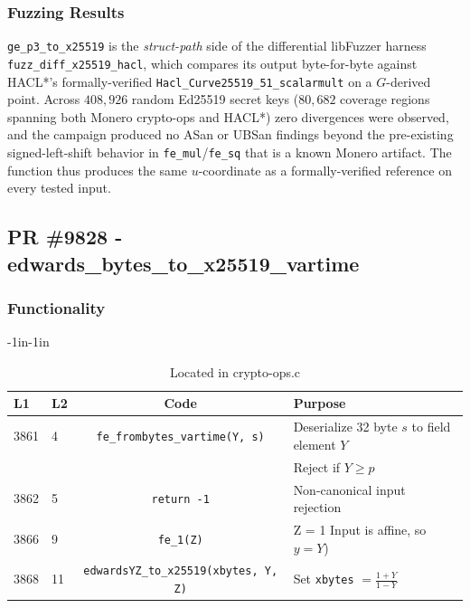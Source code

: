 \documentclass[12pt,titlepage,table]{article}
\begin{document}
\subsubsection{Fuzzing Results}
\verb+ge_p3_to_x25519+ is the \emph{struct-path} side of the differential libFuzzer harness \\ \verb+fuzz_diff_x25519_hacl+, which compares its output byte-for-byte against HACL*'s formally-verified \verb+Hacl_Curve25519_51_scalarmult+ on a $G$-derived point. Across $408{,}926$ random Ed25519 secret keys ($80{,}682$ coverage regions spanning both Monero crypto-ops and HACL*) zero divergences were observed, and the campaign produced no ASan or UBSan findings beyond the pre-existing signed-left-shift behavior in \verb+fe_mul+/\verb+fe_sq+ that is a known Monero artifact.  The function thus produces the same $u$-coordinate as a formally-verified reference on every tested input.

\newpage

\subsection{PR \#9828 - edwards\_bytes\_to\_x25519\_vartime}

\subsubsection{Functionality}


\begin{table}[htbp]
\caption{edwards\_bytes\_to\_x25519\_vartime Source To Spec Map}
\begin{adjustwidth}{-1in}{-1in}
\centering
{
\begin{tabular}{| l | l | c | l |}
\hline
\textbf{L1} & \textbf{L2} & \textbf{Code} & \textbf{Purpose} \\
\hline
\hline
3861 & 4  &\verb+fe_frombytes_vartime(Y, s)+ & Deserialize 32 byte $s$ to field element $Y$ \\
&&& Reject if $Y \geq p$\\
3862 & 5 & \verb|return -1| & Non-canonical input rejection  \\
3866 & 9 &\verb+fe_1(Z)+ & Z = 1 Input is affine, so $y = Y$) \\
3868 & 11 & \verb|edwardsYZ_to_x25519(xbytes, Y, Z)| & Set \verb+xbytes+ $= \frac{1+Y}{1-Y}$  \\
\hline
\end{tabular}}
\end{adjustwidth}
\caption*{Located in crypto-ops.c}
\end{table}
\end{document}
